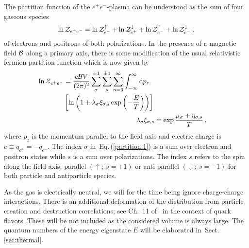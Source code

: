 \documentclass[aps,prd,floatfix,reprint]{revtex4-2}
\newcommand{\req}[1]{Eq.\,(\ref{#1})}
\newcommand{\rsec}[1]{Sect.\,{\ref{#1}}}
\begin{document}
The partition function of the $e^{+}e^{-}$-plasma can be understood as the sum of four gaseous species
\begin{align}
 \label{partition:0} 
 \ln{\cal Z}_{e^{+}e^{-}}=\ln{\cal Z}_{e^{+}}^{\uparrow}+\ln{\cal Z}_{e^{+}}^{\downarrow}+\ln{\cal Z}_{e^{-}}^{\uparrow}+\ln{\cal Z}_{e^{-}}^{\downarrow}\,,
\end{align}
of electrons and positrons of both polarizations. In the presence of a magnetic field ${\cal B}$ along a primary axis, there is some modification of the usual relativistic fermion partition function which is now given by
\begin{align}
 \begin{split}
 \label{partition:1}
 \ln{\cal Z}_{e^{+}e^{-}}&=\frac{e{\cal B}V}{(2\pi)^{2}}\sum_{\sigma}^{\pm1}\sum_{s}^{\pm1}\sum_{n=0}^{\infty}\int_{-\infty}^{\infty}{\rm d}p_{z}\\
 &\left[\ln\left(1+\lambda_{\sigma}\xi_{\sigma,s}\exp\left(-\frac{E}{T}\right)\right)\right]\, 
 \end{split}\\
 \label{partition:2} 
 \lambda_{\sigma}\xi_{\sigma, s} &= \exp{\frac{\mu_{\sigma}+\eta_{\sigma,s}}{T}}\,,
\end{align}
where $p_{z}$ is the momentum parallel to the field axis and electric charge is $e\equiv q_{e^{+}}=-q_{e^{-}}$. The index $\sigma$ in~\req{partition:1} is a sum over electron and positron states while $s$ is a sum over polarizations. The index $s$ refers to the spin along the field axis: parallel $(\uparrow;\ s=+1)$ or anti-parallel $(\downarrow;\ s=-1)$ for both particle and antiparticle species.

As the gas is electrically neutral, we will for the time being ignore charge-charge interactions. There is an additional deformation of the distribution from particle creation and destruction correlations; see Ch.~11 of~\cite{Letessier:2002ony} in the context of quark flavors. These will be not included as the considered volume is always large. The quantum numbers of the energy eigenstate $E$ will be elaborated in~\rsec{sec:thermal}.
\end{document}
